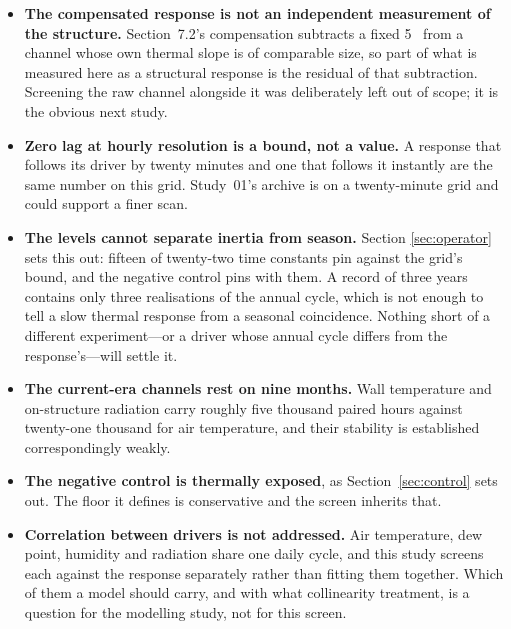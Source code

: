 \documentclass[11pt,a4paper]{article}
\begin{document}
\begin{itemize}
\item \textbf{The compensated response is not an independent measurement of the
structure.} Section~7.2's compensation subtracts a fixed
5~\mdegC{} from a channel whose own thermal slope is of comparable size, so
part of what is measured here as a structural response is the residual of that
subtraction. Screening the raw channel alongside it was deliberately left out of
scope; it is the obvious next study.

\item \textbf{Zero lag at hourly resolution is a bound, not a value.} A response
that follows its driver by twenty minutes and one that follows it instantly are
the same number on this grid. Study~01's archive is on a twenty-minute grid and
could support a finer scan.

\item \textbf{The levels cannot separate inertia from season.} Section
\ref{sec:operator} sets this out: fifteen of twenty-two time constants pin
against the grid's bound, and the negative control pins with them. A record of
three years contains only three realisations of the annual cycle, which is not enough
to tell a slow thermal response from a seasonal coincidence. Nothing short of a
different experiment---or a driver whose annual cycle differs from the
response's---will settle it.

\item \textbf{The current-era channels rest on nine months.} Wall temperature
and on-structure radiation carry roughly five thousand paired hours against
twenty-one thousand for air temperature, and their stability is established
correspondingly weakly.

\item \textbf{The negative control is thermally exposed}, as
Section~\ref{sec:control} sets out. The floor it defines is conservative and the
screen inherits that.

\item \textbf{Correlation between drivers is not addressed.} Air temperature,
dew point, humidity and radiation share one daily cycle, and this study screens
each against the response separately rather than fitting them together. Which of
them a model should carry, and with what collinearity treatment, is a question
for the modelling study, not for this screen.
\end{itemize}
\end{document}
